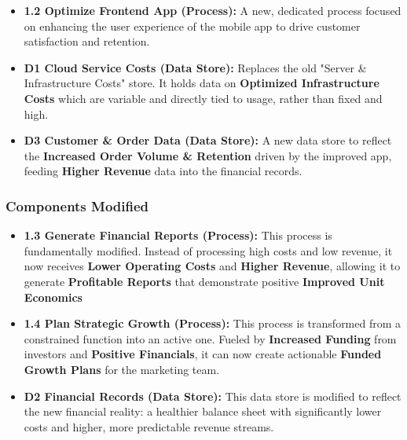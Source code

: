 \documentclass[12pt,a4paper]{article}
\begin{document}
\begin{tcolorbox}[colback=green!5!white,colframe=green!75!black]
\begin{itemize}
    \item \textbf{1.2 Optimize Frontend App (Process):} A new, dedicated process focused on enhancing the user experience of the mobile app to drive customer satisfaction and retention.
    \item \textbf{D1 Cloud Service Costs (Data Store):} Replaces the old "Server \& Infrastructure Costs" store. It holds data on \textbf{Optimized Infrastructure Costs} which are variable and directly tied to usage, rather than fixed and high.
    \item \textbf{D3 Customer \& Order Data (Data Store):} A new data store to reflect the \textbf{Increased Order Volume \& Retention} driven by the improved app, feeding \textbf{Higher Revenue} data into the financial records.
\end{itemize}
\end{tcolorbox}

\subsubsection{Components Modified}
\begin{tcolorbox}[colback=yellow!5!white,colframe=yellow!75!black,title=Modified]
\begin{itemize}
    \item \textbf{1.3 Generate Financial Reports (Process):} This process is fundamentally modified. Instead of processing high costs and low revenue, it now receives \textbf{Lower Operating Costs} and \textbf{Higher Revenue}, allowing it to generate \textbf{Profitable Reports} that demonstrate positive \textbf{Improved Unit Economics}
    \item \textbf{1.4 Plan Strategic Growth (Process):} This process is transformed from a constrained function into an active one. Fueled by \textbf{Increased Funding} from investors and \textbf{Positive Financials}, it can now create actionable \textbf{Funded Growth Plans} for the marketing team.
   \item \textbf{D2 Financial Records (Data Store):} This data store is modified to reflect the new financial reality: a healthier balance sheet with significantly lower costs and higher, more predictable revenue streams.
\end{itemize}
\end{tcolorbox}
\end{document}
